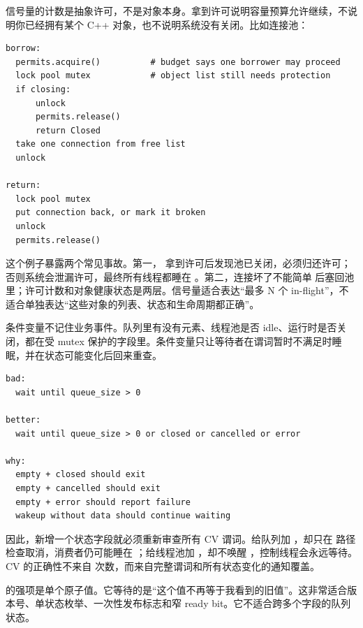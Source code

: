 信号量的计数是抽象许可，不是对象本身。拿到许可说明容量预算允许继续，不说明你已经拥有某个 C++ 对象，也不说明系统没有关闭。比如连接池：

\begin{lstlisting}[numbers=none,caption={semaphore 许可和连接对象是两份状态}]
borrow:
  permits.acquire()          # budget says one borrower may proceed
  lock pool mutex            # object list still needs protection
  if closing:
      unlock
      permits.release()
      return Closed
  take one connection from free list
  unlock

return:
  lock pool mutex
  put connection back, or mark it broken
  unlock
  permits.release()
\end{lstlisting}

这个例子暴露两个常见事故。第一， 拿到许可后发现池已关闭，必须归还许可；否则系统会泄漏许可，最终所有线程都睡在 。第二，连接坏了不能简单  后塞回池里；许可计数和对象健康状态是两层。信号量适合表达“最多 N 个 in-flight”，不适合单独表达“这些对象的列表、状态和生命周期都正确”。

条件变量不记住业务事件。队列里有没有元素、线程池是否 idle、运行时是否关闭，都在受 mutex 保护的字段里。条件变量只让等待者在谓词暂时不满足时睡眠，并在状态可能变化后回来重查。

\begin{lstlisting}[numbers=none,caption={CV 谓词必须写完整}]
bad:
  wait until queue_size > 0

better:
  wait until queue_size > 0 or closed or cancelled or error

why:
  empty + closed should exit
  empty + cancelled should exit
  empty + error should report failure
  wakeup without data should continue waiting
\end{lstlisting}

因此，新增一个状态字段就必须重新审查所有 CV 谓词。给队列加 ，却只在  路径检查取消，消费者仍可能睡在 ；给线程池加 ，却不唤醒 ，控制线程会永远等待。CV 的正确性不来自  次数，而来自完整谓词和所有状态变化的通知覆盖。

 的强项是单个原子值。它等待的是“这个值不再等于我看到的旧值”。这非常适合版本号、单状态枚举、一次性发布标志和窄 ready bit。它不适合跨多个字段的队列状态。

